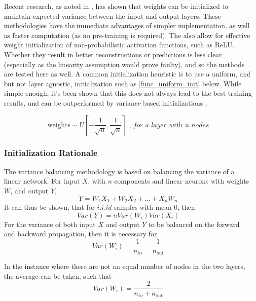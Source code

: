 \documentclass[a4paper,11pt,oneside]{article}
\theoremstyle{plain}
\theoremstyle{definition}
\begin{document}
Recent research, as noted in \cite{He}, has shown that weights can be initialized to maintain expected variance between the input and output layers. These methodologies have the immediate advantages of simpler implementation, as well as faster computation (as no pre-training is required). The also allow for effective weight initialization of non-probabilistic activation functions, such as ReLU. Whether they result in better reconstructions or predictions is less clear (especially as the linearity assumption would prove faulty), and so the methods are tested here as well. 
\newline\newline
A common initialization heuristic is to use a uniform, and but not layer agnostic, initialization such as \ref{func_uniform_init} below. While simple enough, it's been shown that this does not always lead to the best training results, and can be outperformed by variance based initializations \cite{Glorot}.

\begin{equation}\label{func_uniform_init}
\text{weights} \sim U\left[-\frac{1}{\sqrt{n}}, \frac{1}{\sqrt{n}}\right] \textit{ , for a layer with n nodes}
\end{equation}

\subsubsection{Initialization Rationale}

The variance balancing methodology is based on balancing the variance of a linear network. For input $X$, with $n$ components and linear neurons with weights $W$, and output $Y$,
\begin{equation}
Y = W_1X_1 + W_2X_2 + ... + X_nW_n
\end{equation}
It can thus be shown, that for $i.i.id$ samples with mean $0$, then
\begin{equation}
Var(Y) = nVar(W_i)Var(X_i)
\end{equation}
For the variance of both input $X$ and output $Y$ to be balanced on the forward and backward propagation, then it is necessary for
\begin{equation}
Var(W_i) = \frac{1}{n_{in}}= \frac{1}{n_{out}}
\end{equation}

In the instance where there are not an equal number of nodes in the two layers, the average can be taken, such that
 \begin{equation}\label{eq_init_var}
Var(W_i) = \frac{2}{n_{in} + n_{out}}
\end{equation}
\end{document}
